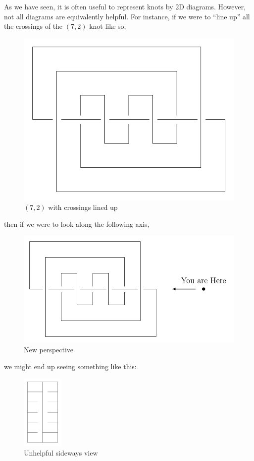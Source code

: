 As we have seen, it is often useful to represent knots by 2D diagrams.
However, not all diagrams are equivalently helpful. For instance, if
we were to ``line up'' all the crossings of the $(7,2)$ knot like so,
\begin{figure}[H]
  \centering
  \includegraphics[scale=.5]{figures/background/rl_7_2.pdf}
  \caption{$(7,2)$ with crossings lined up}
  \label{fig:rl72}
\end{figure}
then if we were to look along the following axis,
\begin{figure}[H]
  \centering
  \includegraphics[scale=.6]{figures/background/rl_7_2_view.pdf}
  \caption{New perspective}
\end{figure}
we might end up seeing something like this:
\begin{figure}[H]
  \centering
  \includegraphics[width=2cm]{figures/background/rl_7_2_side.pdf}
  \caption{Unhelpful sideways view}
  \label{fig:unhelpfulside}
\end{figure}
